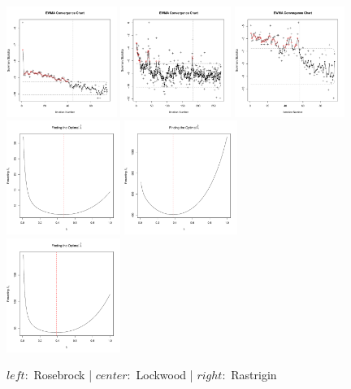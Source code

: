 \documentclass[12pt]{article}
\begin{document}
%
%
\begin{figure}[h!]
\includegraphics[width=0.32\textwidth]{./figures/ewmaConvChartRoseEasyEasyOpt.pdf}
\includegraphics[width=0.32\textwidth]{./figures/ewmaConvChartLock6Three20000Opt.pdf}
\includegraphics[width=0.32\textwidth]{./figures/ewmaConvChartRastHardOpt.pdf}
\includegraphics[width=0.33\textwidth]{./figures/ssRoseEasyEasyOpt.pdf}
\includegraphics[width=0.33\textwidth]{./figures/ssLock6Three20000Opt.pdf}
\includegraphics[width=0.33\textwidth]{./figures/ssRastHardOpt.pdf}
\caption{$left:$ Rosebrock | $center:$ Lockwood | $right:$ Rastrigin}
\label{ewmaFig}
\end{figure}
\end{document}
